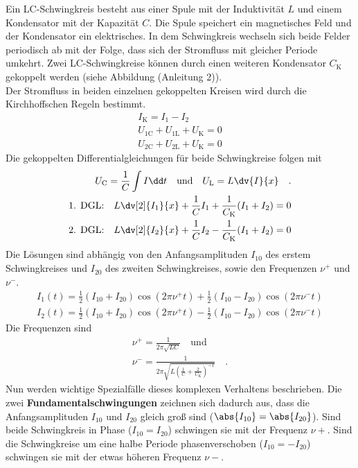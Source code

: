 Ein LC-Schwingkreis besteht aus einer Spule mit der Induktivität $L$ und einem Kondensator mit der Kapazität $C$. Die Spule speichert ein magnetisches Feld und der Kondensator ein elektrisches. In dem Schwingkreis wechseln sich beide Felder periodisch ab mit der Folge, dass sich der Stromfluss  mit gleicher Periode umkehrt. Zwei LC-Schwingkreise können durch einen weiteren Kondensator $C_\text{K}$ gekoppelt werden (siehe Abbildung (Anleitung 2)). \\
Der Stromfluss in beiden einzelnen gekoppelten Kreisen wird durch die Kirchhoffschen Regeln bestimmt.
\begin{align}
I_\text{K} = I_\text{1}-I_\text{2} \\
U_\text{1C} + U_\text{1L} + U_\text{K} = 0 \\
U_\text{2C} + U_\text{2L} + U_\text{K} = 0
\end{align}
Die gekoppelten Differentialgleichungen für beide Schwingkreise folgen mit
\begin{align}
U_\text{C} = \frac{1}{C} \int I \dd t \quad \text{und} \quad U_\text{L} = L \dv{I}{x} \quad .  \\
\text{1. DGL:} \quad L \dv[2]{I_1}{x} + \frac{1}{C} I_1 + \frac{1}{C_\text{K}}(I_1 + I_2) = 0 \\
\text{2. DGL:} \quad L \dv[2]{I_2}{x} + \frac{1}{C} I_2 - \frac{1}{C_\text{K}} (I_1 + I_2) = 0
\end{align}
Die Lösungen sind abhängig von den Anfangsamplituden $I_{10}$ des erstem Schwingkreises und $I_{20}$ des zweiten Schwingkreises, sowie den Frequenzen $\nu^{+}$ und $\nu^{-} $.
\begin{align}
I_1(t) = \frac{1}{2}(I_{10} + I_{20}) \cos(2 \pi \nu^+ t) + \frac{1}{2}(I_{10} - I_{20}) \cos(2 \pi \nu^- t) \\
I_2(t) = \frac{1}{2}(I_{10} + I_{20}) \cos(2 \pi \nu^+ t) - \frac{1}{2}(I_{10} - I_{20}) \cos(2 \pi \nu^- t)
\end{align}
Die Frequenzen sind
\begin{align}
\nu^+ = \frac{1}{2 \pi \sqrt{L C}} \quad \text{und} \\
\nu^- = \frac{1}{2 \pi \sqrt{L\left(\frac{1}{C} + \frac{2}{C_\text{K}}\right)^{-1}}} \quad .
\end{align}
Nun werden wichtige Spezialfälle dieses komplexen Verhaltens beschrieben. Die zwei \textbf{Fundamentalschwingungen} zeichnen sich dadurch aus, dass die Anfangsamplituden $I_{10}$ und $I_{20}$ gleich groß sind ($\abs{I_{10}} = \abs{I_{20}}$). Sind beide Schwingkreis in Phase ($I_{10}=I_{20}$) schwingen sie mit der Frequenz $\nu+$. Sind die Schwingkreise um eine halbe Periode phasenverschoben ($I_{10} = - I_{20}$) schwingen sie mit der etwas höheren Frequenz $\nu-$. \\

